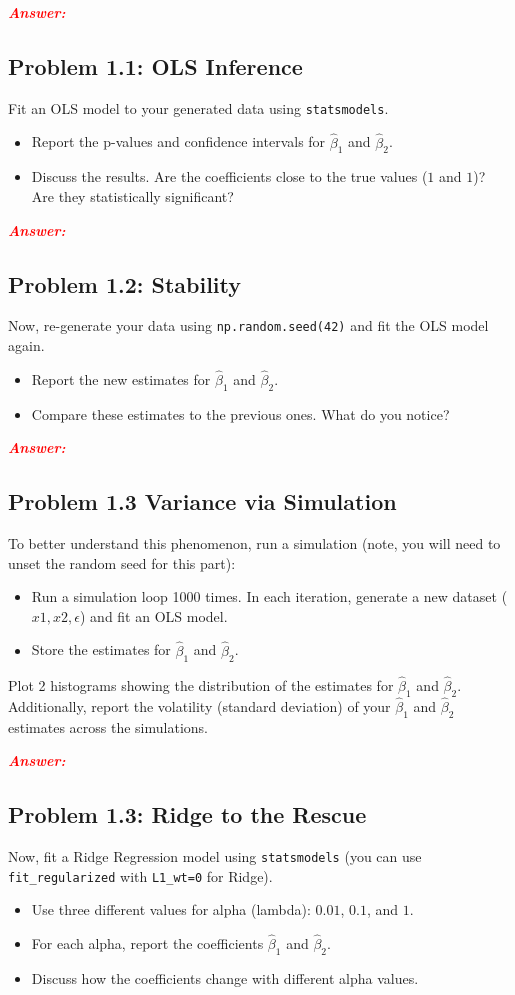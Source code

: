 \documentclass[11pt, letterpaper]{article}
\newcommand{\subproblem}[1]{\subsection*{Problem #1}}
\newcommand{\answer}{\textbf{\textit{\textcolor{red}{Answer:}}}\\}
\begin{document}
\answer


\subproblem{1.1: OLS Inference}
Fit an OLS model to your generated data using \texttt{statsmodels}.
\begin{itemize}
    \item Report the p-values and confidence intervals for $\hat{\beta}_1$ and $\hat{\beta}_2$.
    \item Discuss the results. Are the coefficients close to the true values ($1$ and $1$)? Are they statistically significant?
\end{itemize}

\answer

\subproblem{1.2: Stability}
Now, re-generate your data using \texttt{np.random.seed(42)} and fit the OLS model again.
\begin{itemize}
    \item Report the new estimates for $\hat{\beta}_1$ and $\hat{\beta}_2$.
    \item Compare these estimates to the previous ones. What do you notice?
\end{itemize}

\answer

\subproblem{1.3 Variance via Simulation}

To better understand this phenomenon, run a simulation (note, you will need to unset the random seed for this part):
\begin{itemize}
    \item Run a simulation loop 1000 times. In each iteration, generate a new dataset ($x1, x2, \epsilon$) and fit an OLS model.
    \item Store the estimates for $\hat{\beta}_1$ and $\hat{\beta}_2$.
\end{itemize}
Plot 2 histograms showing the distribution of the estimates for $\hat{\beta}_1$ and $\hat{\beta}_2$.
Additionally, report the volatility (standard deviation) of your $\hat{\beta}_1$ and $\hat{\beta}_2$ estimates across the simulations.

\answer

\subproblem{1.3: Ridge to the Rescue}
Now, fit a Ridge Regression model using \texttt{statsmodels} (you can use \texttt{fit\_regularized} with \texttt{L1\_wt=0} for Ridge).
\begin{itemize}
    \item Use three different values for alpha (lambda): $0.01$, $0.1$, and $1$.
    \item For each alpha, report the coefficients $\hat{\beta}_1$ and $\hat{\beta}_2$.
    \item Discuss how the coefficients change with different alpha values.
\end{itemize}
\end{document}
